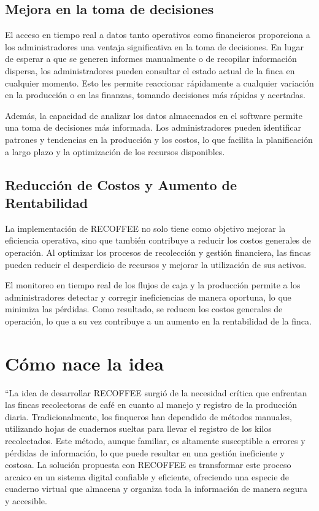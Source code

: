 \documentclass[12pt]{article}
\begin{document}
\subsection{Mejora en la toma de decisiones}

El acceso en tiempo real a datos tanto operativos como financieros proporciona a los administradores una ventaja significativa en la toma de decisiones. En lugar de esperar a que se generen informes manualmente o de recopilar informaci\'on dispersa, los administradores pueden consultar el estado actual de la finca en cualquier momento. Esto les permite reaccionar r\'apidamente a cualquier variaci\'on en la producci\'on o en las finanzas, tomando decisiones m\'as r\'apidas y acertadas.

Adem\'as, la capacidad de analizar los datos almacenados en el software permite una toma de decisiones m\'as informada. Los administradores pueden identificar patrones y tendencias en la producci\'on y los costos, lo que facilita la planificaci\'on a largo plazo y la optimizaci\'on de los recursos disponibles.

\subsection{Reducción de Costos y Aumento de Rentabilidad}

La implementación de RECOFFEE no solo tiene como objetivo mejorar la eficiencia operativa, sino que también contribuye a reducir los costos generales de operación. Al optimizar los procesos de recolección y gestión financiera, las fincas pueden reducir el desperdicio de recursos y mejorar la utilización de sus activos.

El monitoreo en tiempo real de los flujos de caja y la producción permite a los administradores detectar y corregir ineficiencias de manera oportuna, lo que minimiza las pérdidas. Como resultado, se reducen los costos generales de operación, lo que a su vez contribuye a un aumento en la rentabilidad de la finca.

\section{Cómo nace la idea}

“La idea de desarrollar RECOFFEE surgió de la necesidad crítica que enfrentan las fincas recolectoras de café en cuanto al manejo y registro de la producción diaria. Tradicionalmente, los finqueros han dependido de métodos manuales, utilizando hojas de cuadernos sueltas para llevar el registro de los kilos recolectados. Este método, aunque familiar, es altamente susceptible a errores y pérdidas de información, lo que puede resultar en una gestión ineficiente y costosa. La solución propuesta con RECOFFEE es transformar este proceso arcaico en un sistema digital confiable y eficiente, ofreciendo una especie de cuaderno virtual que almacena y organiza toda la información de manera segura y accesible.
\end{document}
